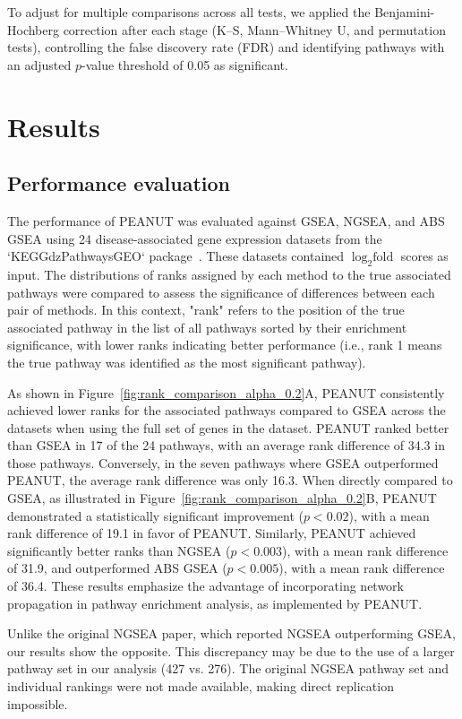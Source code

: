 \documentclass{article}
\begin{document}
To adjust for multiple comparisons across all tests, we applied the Benjamini-Hochberg correction \cite{Benjamini1995} after each stage (K--S, Mann--Whitney U, and permutation tests), controlling the false discovery rate (FDR) and identifying pathways with an adjusted $p$-value threshold of 0.05 as significant.


\section{Results}
\subsection{Performance evaluation}
The performance of PEANUT was evaluated against GSEA, NGSEA, and ABS GSEA using 24 disease-associated gene expression datasets from the `KEGGdzPathwaysGEO` package~\cite{Tarca2013}. These datasets contained $\log_{2}\text{fold}$ scores as input. The distributions of ranks assigned by each method to the true associated pathways were compared to assess the significance of differences between each pair of methods. In this context, "rank" refers to the position of the true associated pathway in the list of all pathways sorted by their enrichment significance, with lower ranks indicating better performance (i.e., rank 1 means the true pathway was identified as the most significant pathway).

As shown in Figure~\ref{fig:rank_comparison_alpha_0.2}A, PEANUT consistently achieved lower ranks for the associated pathways compared to GSEA across the datasets when using the full set of genes in the dataset. PEANUT ranked better than GSEA in 17 of the 24 pathways, with an average rank difference of 34.3 in those pathways. Conversely, in the seven pathways where GSEA outperformed PEANUT, the average rank difference was only 16.3. When directly compared to GSEA, as illustrated in Figure~\ref{fig:rank_comparison_alpha_0.2}B, PEANUT demonstrated a statistically significant improvement ($p<0.02$), with a mean rank difference of 19.1 in favor of PEANUT. Similarly, PEANUT achieved significantly better ranks than NGSEA ($p<0.003$), with a mean rank difference of 31.9, and outperformed ABS GSEA ($p<0.005$), with a mean rank difference of 36.4. These results emphasize the advantage of incorporating network propagation in pathway enrichment analysis, as implemented by PEANUT.

Unlike the original NGSEA paper, which reported NGSEA outperforming GSEA, our results show the opposite. This discrepancy may be due to the use of a larger pathway set in our analysis (427 vs. 276). The original NGSEA pathway set and individual rankings were not made available, making direct replication impossible.
\end{document}
